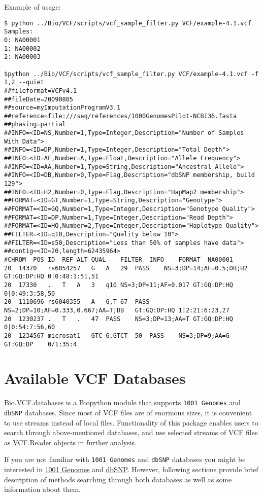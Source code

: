 \noindent Example of usage:
\begin{verbatim}
$ python ../Bio/VCF/scripts/vcf_sample_filter.py VCF/example-4.1.vcf
Samples:
0: NA00001
1: NA00002
2: NA00003

$python ../Bio/VCF/scripts/vcf_sample_filter.py VCF/example-4.1.vcf -f 1,2 --quiet
##fileformat=VCFv4.1
##fileDate=20090805
##source=myImputationProgramV3.1
##reference=file:///seq/references/1000GenomesPilot-NCBI36.fasta
##phasing=partial
##INFO=<ID=NS,Number=1,Type=Integer,Description="Number of Samples With Data">
##INFO=<ID=DP,Number=1,Type=Integer,Description="Total Depth">
##INFO=<ID=AF,Number=A,Type=Float,Description="Allele Frequency">
##INFO=<ID=AA,Number=1,Type=String,Description="Ancestral Allele">
##INFO=<ID=DB,Number=0,Type=Flag,Description="dbSNP membership, build 129">
##INFO=<ID=H2,Number=0,Type=Flag,Description="HapMap2 membership">
##FORMAT=<ID=GT,Number=1,Type=String,Description="Genotype">
##FORMAT=<ID=GQ,Number=1,Type=Integer,Description="Genotype Quality">
##FORMAT=<ID=DP,Number=1,Type=Integer,Description="Read Depth">
##FORMAT=<ID=HQ,Number=2,Type=Integer,Description="Haplotype Quality">
##FILTER=<ID=q10,Description="Quality below 10">
##FILTER=<ID=s50,Description="Less than 50% of samples have data">
##contig=<ID=20,length=62435964>
#CHROM	POS	ID	REF	ALT	QUAL	FILTER	INFO	FORMAT	NA00001
20	14370	rs6054257	G	A	29	PASS	NS=3;DP=14;AF=0.5;DB;H2	GT:GQ:DP:HQ	0|0:48:1:51,51
20	17330	.	T	A	3	q10	NS=3;DP=11;AF=0.017	GT:GQ:DP:HQ	0|0:49:3:58,50
20	1110696	rs6040355	A	G,T	67	PASS	NS=2;DP=10;AF=0.333,0.667;AA=T;DB	GT:GQ:DP:HQ	1|2:21:6:23,27
20	1230237	.	T	.	47	PASS	NS=3;DP=13;AA=T	GT:GQ:DP:HQ	0|0:54:7:56,60
20	1234567	microsat1	GTC	G,GTCT	50	PASS	NS=3;DP=9;AA=G	GT:GQ:DP	0/1:35:4
\end{verbatim}   


\section{Available VCF Databases}

\noindent Bio.VCF.databases is a Biopython module that supports \verb|1001 Genomes| and \verb|dbSNP| databases.
Since most of VCF files are of enormous sizes, it is convenient to use streams instead of local files.
Functionality of this package enables users to search through above-mentioned databases, and use selected streams
of VCF files as VCF.Reader objects in further analysis.


\noindent If you are not familiar with \verb|1001 Genomes| and \verb|dbSNP| databases you might be interested in
\href{http://1001genomes.org/}{1001 Genomes} and \href{https://www.ncbi.nlm.nih.gov/SNP/}{dbSNP}. However, following
sections provide brief description of methods searching through both databases as well as some information about them.


